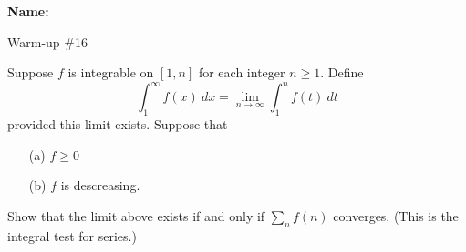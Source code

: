 \documentclass[12pt]{article}
\begin{document}
\noindent \textbf{Name:} 

\begin{center}
Warm-up \#16
\end{center}

\noindent Suppose $f$ is integrable on $[1,n]$ for each integer $n \geqslant 1.$ Define 
\[
\int_1^\infty f(x) \: dx = \lim_{n \to \infty} \int_1^n f(t) \: dt
\]
provided this limit exists. Suppose that 
\begin{enumerate}
\item[(a)] $f \geqslant 0$
\item[(b)] $f$ is descreasing.
\end{enumerate}
Show that the limit above exists if and only if $\sum_n f(n)$ converges. (This is the integral test for series.)
\end{document}
